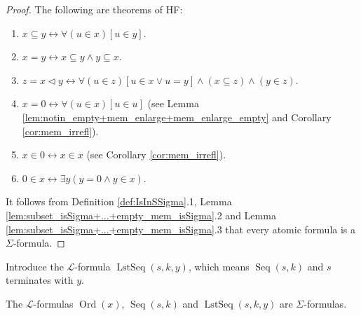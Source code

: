 \begin{proof}
    The following are theorems of HF:
    \begin{enumerate}
        \item $x \subseteq y \leftrightarrow \forall (u \in x)[u \in y]$.
        \item $x = y \leftrightarrow x \subseteq y \land y \subseteq x$.
        \item $z = x \lhd y \leftrightarrow \forall(u \in z)[u \in x \lor u = y] 
        \land (x \subseteq z) \land (y \in z)$.
        \item $x = 0 \leftrightarrow \forall (u \in x)[u \in u]$ (see Lemma 
        \ref{lem:notin_empty+mem_enlarge+mem_enlarge_empty} and Corollary \ref{cor:mem_irrefl}).
        \item $x \in 0 \leftrightarrow x \in x$ (see Corollary \ref{cor:mem_irrefl}).
        \item $0 \in x \leftrightarrow \exists y (y = 0 \land y \in x)$.
    \end{enumerate}
    It follows from Definition \ref{def:IsInSSigma}.1, 
    Lemma \ref{lem:subset_isSigma+...+empty_mem_isSigma}.2 and 
    Lemma \ref{lem:subset_isSigma+...+empty_mem_isSigma}.3 that every atomic formula is a
    $\Sigma$-formula.
\end{proof}

\begin{lemma}
    \label{lem:Ord_isSigma+Seq_isSigma+LstSeq_isSigma}
    Introduce the $\mathcal{L}$-formula $\operatorname{LstSeq}(s,k,y)$, which means
    $\operatorname{Seq}(s,k)$ and $s$ terminates with $y$.
    
    The $\mathcal{L}$-formulas $\operatorname{Ord}(x)$, $\operatorname{Seq}(s,k)$ and
    $\operatorname{LstSeq}(s,k,y)$ are $\Sigma$-formulas.
\end{lemma}

